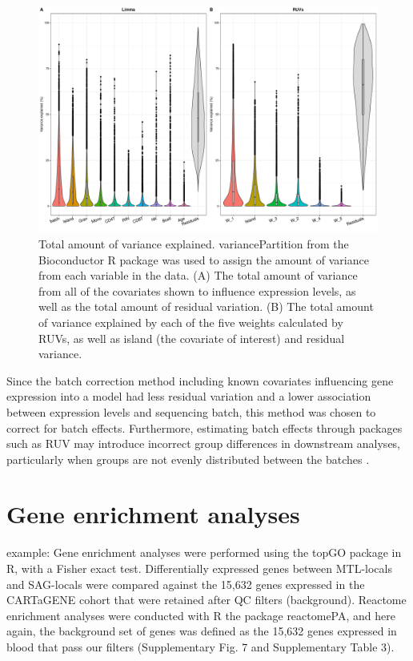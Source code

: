 \documentclass[12pt,a4paper,titlepage,twoside,openright]{book}
\begin{document}
\begin{mainmatter}
{\begin{figure}[htb!]
\centering
\includegraphics[width=\textwidth,height=\textheight,keepaspectratio]{Figures/VarianceExplained_LMvsRUVs.pdf}
\caption{Total amount of variance explained. variancePartition from the Bioconductor R package was used to assign the amount of variance from each variable in the data. (A) The total amount of variance from all of the covariates shown to influence expression levels, as well as the total amount of residual variation. (B) The total amount of variance explained by each of the five weights calculated by RUVs, as well as island (the covariate of interest) and residual variance.}
\label{fig:Variance Explained}
\end{figure}

Since the batch correction method including known covariates influencing gene expression into a model had less residual variation and a lower association between expression levels and sequencing batch, this method was chosen to correct for batch effects. Furthermore, estimating batch effects through packages such as RUV may introduce incorrect group differences in downstream analyses, particularly when groups are not evenly distributed between the batches \cite{nygaard2016methods}.

\section{Gene enrichment analyses}
example: Gene enrichment analyses were performed using the topGO package in R, with a Fisher exact test. Differentially expressed genes between MTL-locals and SAG-locals were compared against the 15,632 genes expressed in the CARTaGENE cohort that were retained after QC filters (background). Reactome enrichment analyses were conducted with R the package reactomePA, and here again, the background set of genes was defined as the 15,632 genes expressed in blood that pass our filters (Supplementary Fig. 7 and Supplementary Table 3).

}
\end{mainmatter}
\end{document}

